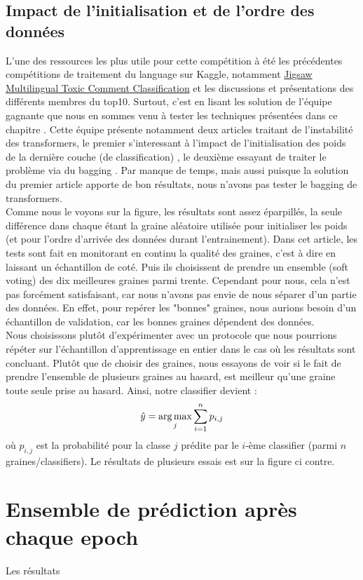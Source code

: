 \subsection{Impact de l'initialisation et de l'ordre des données}
L'une des ressources les plus utile pour cette compétition à été les précédentes compétitions de traitement du language sur Kaggle, notamment \href{https://www.kaggle.com/c/jigsaw-multilingual-toxic-comment-classification/overview}{Jigsaw Multilingual Toxic Comment Classification} et les discussions et présentations des différents membres du top10. Surtout, c'est en lisant les solution de l'équipe gagnante que nous en sommes venu à tester les techniques présentées dans ce chapitre . Cette équipe présente notamment deux articles traitant de l'instabilité des transformers, le premier s'interessant à l'impact de l'initialisation des poids de la dernière couche (de classification) , le deuxième essayant de traiter le problème via du bagging . Par manque de temps, mais aussi puisque la solution du premier article apporte de bon résultats, nous n'avons pas tester le bagging de transformers. \\
Comme nous le voyons sur la figure, les résultats sont assez éparpillés, la seule différence dans chaque étant la graine aléatoire utilisée pour initialiser les poids (et pour l'ordre d'arrivée des données durant l'entrainement). Dans cet article, les tests sont fait en monitorant en continu la qualité des graines, c'est à dire en laissant un échantillon de coté. Puis ils choisissent de prendre un ensemble (soft voting) des dix meilleures graines parmi trente. Cependant pour nous, cela n'est pas forcément satisfaisant, car nous n'avons pas envie de nous séparer d'un partie des données. En effet, pour repérer les "bonnes" graines, nous aurions besoin d'un échantillon de validation, car les bonnes graines dépendent des données. \\
Nous choisissons plutôt d'expérimenter avec un protocole que nous pourrions répéter sur l'échantillon d'apprentissage en entier dans le cas où les résultats sont concluant. Plutôt que de choisir des graines, nous essayons de voir si le fait de prendre l'ensemble de plusieurs graines au hasard, est meilleur  qu'une graine toute seule prise au hasard. Ainsi, notre classifier devient : $$ \hat y = \operatorname*{arg\,max}_j \sum_{i=1}^n p_{i,j} $$ où $p_{i,j}$ est la probabilité pour la classe $j$ prédite par le $i$-ème classifier (parmi $n$ graines/classifiers). Le résultats de plusieurs essais est sur la figure ci contre.


\section{Ensemble de prédiction après chaque epoch}
Les résultats 

